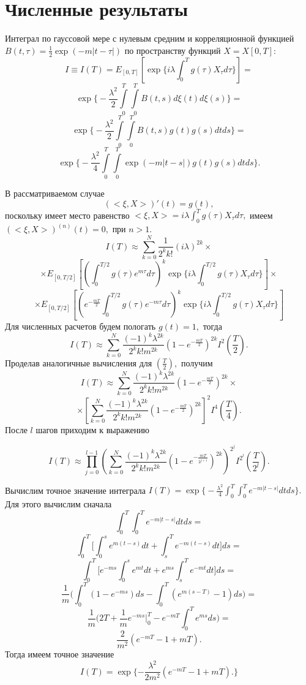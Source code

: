 \documentclass [12pt]{report}
\begin{document}
\chapter{Численные результаты}

Интеграл по гауссовой мере с нулевым средним и корреляционной функцией
$B(t,\tau) = \frac{1}{2}\exp(-m|t-\tau|)$
по пространству функций $X=X[0, T]:$
$$
I\equiv I(T) =
E_{[0,T]}[\exp\{i\lambda\int_{0}^{T}g(\tau)X_\tau d\tau\}] =
$$
$$
\exp\Big\{-\frac{\lambda^2}{2}\int\limits_0^T\int\limits_0^T
B(t,s)d\xi(t)d\xi(s)\Big\} =
$$
$$
\exp\Big\{-\frac{\lambda^2}{2}\int\limits_0^T\int\limits_0^T
B(t,s)g(t)g(s)dtds\Big\} =
$$
$$
\exp\Big\{-\frac{\lambda^2}{4}\int\limits_0^T\int\limits_0^T
\exp(-m|t-s|)g(t)g(s)dtds\Big\}.
$$

В рассматриваемом случае
$$
(<\xi,X>)'(t)= g(t),
$$
поскольку имеет место равенство
$<\xi, X> = i\lambda\int_{0}^{T}g(\tau)X_\tau d\tau , $
имеем $ (<\xi,X>)^{(n)}(t)= 0,$ при $ n > 1. $
$$
I(T)\approx \sum_{k=0}^{N}\frac{1}{2^k k!}(i\lambda)^{2k}\times
$$
$$
\times E_{[0,T/2]}[(\int_{0}^{T/2}g(\tau)e^{m\tau}d\tau)^k
\exp\{i\lambda\int_{0}^{T/2}g(\tau)X_\tau d\tau\}]\times
$$
$$
\times E_{[0,T/2]}[(e^{-\frac{mT}{2}}\int_{0}^{T/2}g(\tau)e^{-m\tau}d\tau)^k
\exp\{i\lambda\int_{0}^{T/2}g(\tau)X_\tau d\tau\}]
$$
Для численных расчетов будем пологать $g(t) = 1,$ тогда
$$
I(T)\approx  \sum_{k=0}^{N}\frac{(-1)^k\lambda^{2k}}{2^k k!m^{2k}}
(1 - e^{-\frac{mT}{2}})^{2k} I^2(\frac{T}{2}).
$$
Проделав аналогичные вычисления для $(\frac{T}{2}),$ получим
$$
I(T)\approx \sum_{k=0}^{N}\frac{(-1)^k\lambda^{2k}}{2^k k!m^{2k}}
(1 - e^{-\frac{mT}{2}})^{2k} \times
$$
$$
\times[\sum_{k=0}^{N}\frac{(-1)^k\lambda^{2k}}{2^k k!m^{2k}}
(1 - e^{-\frac{mT}{2}})^{2k}]^2 I^4(\frac{T}{4}).
$$
После $l$ шагов приходим к выражению

\begin{equation}\label{eq:5}
I(T)\approx \prod_{j=0}^{l-1}(
\sum_{k=0}^{N}\frac{(-1)^k\lambda^{2k}}{2^k k!m^{2k}}
(1 - e^{-\frac{mT}{2^{j+1}}})^{2k})^{2^j}
I^{2^l}(\frac{T}{2^l}).
\end{equation}

Вычислим точное значение интеграла $ I(T) = \exp\Big\{-\frac{\lambda^2}{4}
\int_{0}^{T}\int_{0}^{T} e^{-m|t-s|}dtds\Big\}.$ \\
Для этого вычислим сначала
$$
\int_{0}^{T}\int_{0}^{T} e^{-m|t-s|}dtds =
$$
$$
\int_{0}^{T} \Big[
\int_{0}^{s} e^{m(t-s)}dt + \int_{s}^{T} e^{-m(t-s)}dt
\Big]ds =
$$
$$
\int_{0}^{T} \Big[
e^{-ms}\int_{0}^{s} e^{mt}dt + e^{ms}\int_{s}^{T} e^{-mt}dt
\Big]ds =
$$
$$
\frac{1}{m} \Big( \int_{0}^{T}(1-e^{-ms})ds -
\int_{0}^{T}(e^{m(s-T)}-1)ds \Big) =
$$
$$
\frac{1}{m} \Big( 2T + \frac{1}{m}e^{-ms}\Big|_{0}^T -
e^{-mT}\int_{0}^{T}e^{ms}ds \Big) =
$$
$$
\frac{2}{m^2}(e^{-mT} - 1 + mT).
$$
Тогда имеем точное значение
$$
I(T) = \exp\{ -\frac{\lambda^2}{2m^2}(e^{-mT} - 1 + mT). \}
$$
\end{document}
